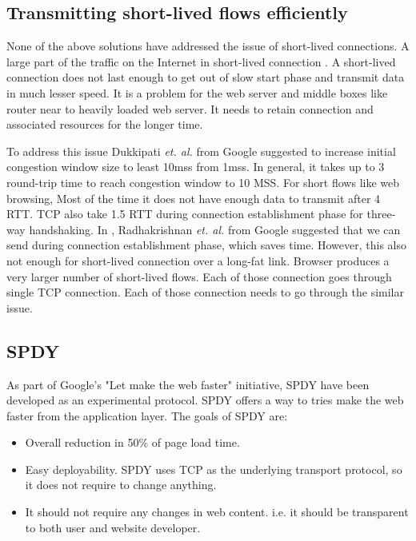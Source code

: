 \subsection{Transmitting short-lived flows efficiently}

None of the above solutions have addressed the issue of short-lived connections. A large part of the traffic on the Internet in short-lived connection \cite{kheirkhah2015short}. A short-lived connection does not last enough to get out of slow start phase and transmit data in much lesser speed. It is a problem for the web server and middle boxes like router near to heavily loaded web server. It needs to retain connection and associated resources for the longer time. 

To address this issue Dukkipati \textit{et. al.} from Google suggested to increase initial congestion window size to least 10mss\cite{google-long-initcwnd} from 1mss. In general, it takes up to 3 round-trip time to reach congestion window to 10 MSS. For short flows like web browsing, Most of the time it does not have enough data to transmit after 4 RTT. TCP also take 1.5 RTT during connection establishment phase for three-way handshaking. In \cite{google-fast-open}, Radhakrishnan \textit{et. al.} from Google suggested that we can send during connection establishment phase, which saves time. However, this also not enough for short-lived connection over a long-fat link. Browser produces a very larger number of short-lived flows. Each of those connection goes through single TCP connection. Each of those connection needs to go through the similar issue. 

\subsection{SPDY}
As part of Google's "Let make the web faster" initiative, SPDY have been developed as an experimental protocol\cite{spdy}. SPDY offers a way to tries make the web faster from the application layer. The goals of SPDY are:
\begin{itemize}
    \item Overall reduction in 50\% of page load time.
    \item Easy deployability. SPDY uses TCP as the underlying transport protocol, so it does not require to change anything.
    \item It should not require any changes in web content. i.e. it should be transparent to both user and website developer.
\end{itemize}

